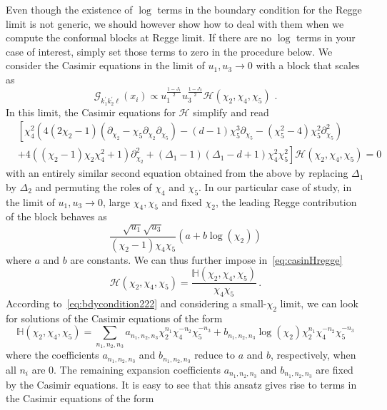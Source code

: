 Even though the existence of $\log$ terms in the boundary condition for the Regge limit is not generic, we should however show how to deal with them when we compute the conformal blocks at Regge limit. If there are no $\log$ terms in your case of interest, simply set those terms to zero in the procedure below.
We consider the Casimir equations in the limit of $u_1, u_3 \to 0$ with a block that scales as
\begin{equation}
  \mathcal{G}_{k_{1}^{\prime} k_{2}^{\prime}\ell}(x_i) \propto u_1^{\frac{1-J_1}{2}} u_3^{\frac{1-J_2}{2}}\mathcal{H}(\chi_2,\chi_4,\chi_5)\,\,.
\end{equation}
In this limit, the Casimir equations for $\mathcal{H}$ simplify and read
\begin{align}
  \label{eq:casinHregge}
   & \left[\chi_4^2 \left(4 (2\chi_2-1) (\partial_{\chi_2}-\chi_5 \partial_{\chi_2}\partial_{\chi_5})-(d-1) \chi_5^3 \partial_{\chi_5}-\left(\chi_5^2-4\right) \chi_5^2 \partial_{\chi_5}^2\right)\right.\nonumber \\
   & \left.+4\left((\chi_2-1) \chi_2 \chi_4^2+1\right)\partial_{\chi_2}^2+(\Delta_1-1)(\Delta_1-d+1)\chi_4^2 \chi_5^2\right]\mathcal{H}(\chi_2,\chi_4,\chi_5)=0
\end{align}
with an entirely similar second equation obtained from the above by replacing $\Delta_1$ by $\Delta_2$ and permuting the roles of $\chi_4$ and $\chi_5$. In our particular case of study, in the limit of $u_1, u_3 \to 0$, large $\chi_4, \chi_5$ and fixed $\chi_2$, the leading Regge contribution of the block behaves as
\begin{equation}
  \label{eq:bdycondition222}
  \frac{\sqrt{u_1}\sqrt{u_3}}{(\chi_2-1)\chi_4 \chi_5}\left(a+b \log(\chi_2)\right)
\end{equation}
where $a$ and $b$ are constants. We can thus further impose in~\eqref{eq:casinHregge}
\begin{equation}
  \mathcal{H}(\chi_2,\chi_4,\chi_5)=\frac{\mathbb{H}(\chi_2,\chi_4,\chi_5)}{\chi_4  \chi_5}\,.
\end{equation}
According to~\eqref{eq:bdycondition222} and considering a small-$\chi_2$  limit, we can look for solutions of the Casimir equations of the form
\begin{equation}
  \mathbb{H}(\chi_2,\chi_4,\chi_5)=\sum_{n_1,n_2,n_3} a_{n_1,n_2,n_3} \chi_2^{n_1} \chi_4^{-n_2} \chi_5^{-n_3}+ b_{n_1,n_2,n_3} \log(\chi_2) \chi_2^{n_1} \chi_4^{-n_2} \chi_5^{-n_3}
\end{equation}
where the coefficients $a_{n_1,n_2,n_3}$ and $b_{n_1, n_2,n_3}$ reduce to $a$ and $b$, respectively, when all $n_i$ are 0. The remaining expansion coefficients $a_{n_1,n_2,n_3}$ and $b_{n_1, n_2,n_3}$ are fixed by the Casimir equations. It is easy to see that this ansatz gives rise to terms in the Casimir equations of the form
